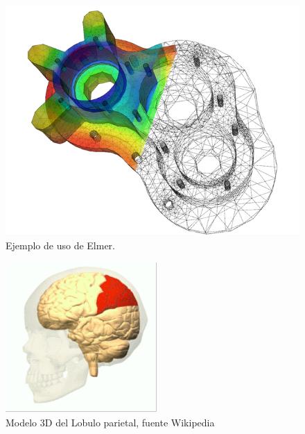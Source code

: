 \begin{figure} %
\centering
\includegraphics[scale=0.2]{imagenes/614px-Elmer-pump-heatequation.png} 
\caption{Ejemplo de uso de Elmer. \cite{ElmerpumpheatequationPng}}
 \label{fig:Elmer-pump-heatequation.png}
\end{figure}

\begin{figure} %
\centering
\includegraphics[scale=0.6]{imagenes/lobulo_parietal.png} 
\caption{Modelo 3D del Lobulo parietal, fuente Wikipedia} \label{fig:lobulo_parietal.png}
\end{figure}

